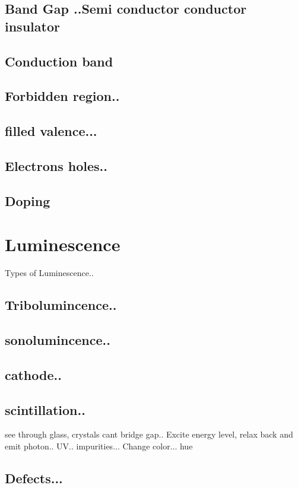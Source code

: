 \documentclass[prl,onecolumn]{revtex4-1}  %
\begin{document}
\subsection*{Band Gap ..Semi conductor conductor insulator }
\lipsum[1-1]
\subsection*{Conduction band}
\lipsum[1-1]
\subsection*{Forbidden region..}
\lipsum[1-1]
\subsection*{filled valence... }
\lipsum[1-1]
\subsection*{Electrons holes..}
\lipsum[1-1]
\subsection*{Doping}
\lipsum[1-1]
\section{Luminescence}
Types of Luminescence..
\subsection*{Tribolumincence..}
\lipsum[1-1]
\subsection*{sonolumincence..}
\lipsum[1-1]
\subsection*{cathode..}
\lipsum[1-1]
\subsection*{scintillation..}

see through glass, crystals cant bridge gap..
Excite energy level, relax back and emit photon.. UV..
impurities...
Change color... hue
\subsection*{Defects...}
\lipsum[1-1]
\end{document}
